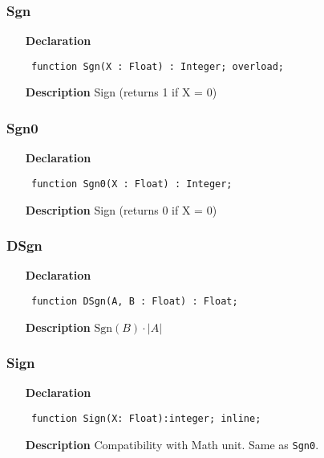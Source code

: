 \documentclass[12pt,a4paper,oneside]{report}
\newcommand{\lmath}[1]{   %
	\marginpar{\vspace{#1} 
		\begin{flushright}
			LMath
	\end{flushright} }
}
\newcommand{\declarationitem}[1]{\textbf{#1}}
\newcommand{\descriptiontitle}[1]{\textbf{#1}}
\newcommand{\code}[1]{\texttt{#1}}
\begin{document}
\subsubsection{Sgn}
\label{uminmax-Sgn}
\begin{itemize}\item[\declarationitem{Declaration}\hfill]
	\begin{flushleft}
		\code{
			function Sgn(X : Float) : Integer; overload;}
	\end{flushleft}
	\item[\descriptiontitle{Description}]
	Sign (returns 1 if X = 0)
\end{itemize}
\subsubsection{Sgn0}
\label{uminmax-Sgn0}
\begin{itemize}\item[\declarationitem{Declaration}\hfill]
	\begin{flushleft}
		\code{
			function Sgn0(X : Float) : Integer;}
	\end{flushleft}
	\item[\descriptiontitle{Description}]
	Sign (returns 0 if X = 0)	
\end{itemize}
\subsubsection{DSgn}
\label{uminmax-DSgn}
\begin{itemize}\item[\declarationitem{Declaration}\hfill]
	\begin{flushleft}
		\code{
			function DSgn(A, B : Float) : Float;}
	\end{flushleft}
	\par
	\item[\descriptiontitle{Description}]
	$\textrm{Sgn}(B)\cdot|A|$
\end{itemize}
\subsubsection{Sign}
\lmath{-24pt}
\label{uminmax-Sign}
\begin{itemize}\item[\declarationitem{Declaration}\hfill]
	\begin{flushleft}
		\code{
			function Sign(X: Float):integer; inline;}
		
	\end{flushleft}
	
	\par
	\item[\descriptiontitle{Description}]
	Compatibility with Math unit. Same as \code{Sgn0}. 
	
\end{itemize}
\end{document}

